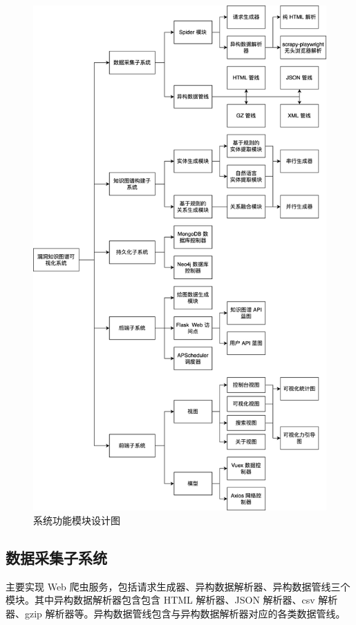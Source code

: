 \documentclass[a4paper,AutoFakeBold,oneside,12pt]{book}
\begin{document}
\begin{figure}
	\includegraphics[height=0.95\textheight]{pictures/CyKG_OrgChart-中文.png}
	\caption{系统功能模块设计图}
	\label{CyKG_OrgChart}
\end{figure}

\subsection{数据采集子系统}

主要实现 Web 爬虫服务，包括请求生成器、异构数据解析器、异构数据管线三个模块。其中异构数据解析器包含包含 HTML 解析器、JSON 解析器、csv 解析器、gzip 解析器等。异构数据管线包含与异构数据解析器对应的各类数据管线。
\end{document}
